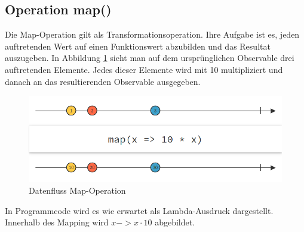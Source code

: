 \subsection{Operation map()}
Die Map-Operation gilt als Transformationsoperation. Ihre Aufgabe ist es, jeden auftretenden Wert auf einen Funktionswert abzubilden und das Resultat auszugeben. In Abbildung \ref{pic:map} sieht man auf dem ursprünglichen Observable drei auftretenden Elemente. Jedes dieser Elemente wird mit 10 multipliziert und danach an das resultierenden Observable ausgegeben. 
\begin{figure}[hbt]
	\centering
	\includegraphics[width=1\textwidth]{Abb/map}
	\caption{Datenfluss Map-Operation}
	\label{pic:map}
\end{figure}
 
In Programmcode wird es wie erwartet als Lambda-Ausdruck dargestellt. Innerhalb des Mapping wird $x -> x \cdot 10$ abgebildet.
